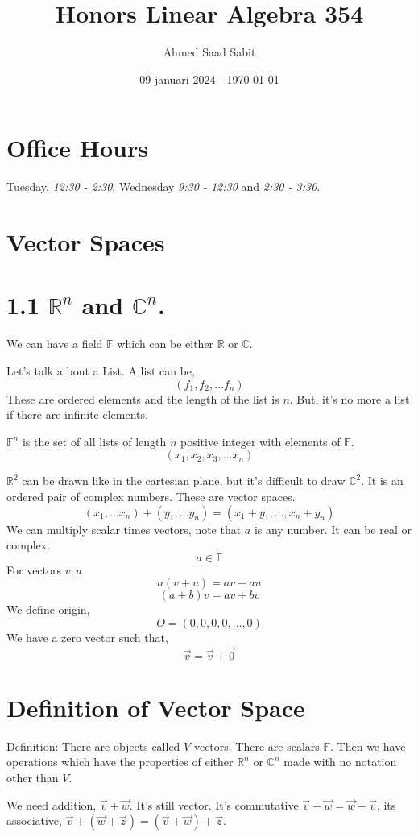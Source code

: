 \documentclass[a4paper]{article}
\title{Honors Linear Algebra 354}
\author{Ahmed Saad Sabit}
\date{09 januari 2024 - \today}
\begin{document}
\maketitle
\section{Office Hours} 
Tuesday, \emph{12:30 - 2:30}. Wednesday \emph{9:30 - 12:30} and  \emph{2:30 - 3:30}.

\section{Vector Spaces}
\section{1.1 $\mathbb{R}^{n}$ and $\mathbb{C}^{n}$.}
We can have a field $\mathbb{F}$ which can be either $\mathbb{R}$ or $\mathbb{C}$. 

Let's talk a bout a List. A list can be,
\[
	(f_1, f_2, \ldots f_n)
\] 
These are ordered elements and the length of the list is $n$. But, it's no more a list if there are infinite elements. 

$\mathbb{F}^{n}$ is the set of all lists of length $n$ positive integer with elements of $\mathbb{F}$. 
\[
	\left(x_1, x_2, x_3, \ldots x_{n} \right)
\] 

$\mathbb{R}^{2}$ can be drawn like in the cartesian plane, but it's difficult to draw $\mathbb{C}^{2}$. It is an ordered pair of complex numbers. These are vector spaces. 
\[
	\left(x_1, \ldots x_{n}\right) + 
	\left(y_1, \ldots y_{n}\right) = 
	\left(x_1 + y_1, \ldots, x_{n} + y_{n}\right)
\] 
We can multiply scalar times vectors, note that $a$ is any number. It can be real or complex.  
\[
a \in \mathbb{F} 
\] For vectors $v,u$
\[
a \left(v + u\right) = av + au
\] 
\[
	\left(a+b\right) v = av + bv
\] 
We define origin, 
\[
O = 	\left(0,0,0,0, \ldots, 0\right)
\] 
We have a zero vector such that, 
\[
\vec{v} = \vec{v} + \vec{0}
\] 

\section{Definition of Vector Space}
Definition: There are objects called $V$ vectors. There are scalars $\mathbb{F}$. Then we have operations which have the properties of either $\mathbb{R}^{n}$ or $\mathbb{C}^{n}$ made with no notation other than $V$. 

We need addition, $\vec{v} + \vec{w}$. It's still vector. It's commutative $\vec{v} + \vec{w} = \vec{w} + \vec{v}$, its associative, $\vec{v} + \left(\vec{w} + \vec{z}\right) = \left(\vec{v} + \vec{w}\right) + \vec{z}$. 
\end{document}
